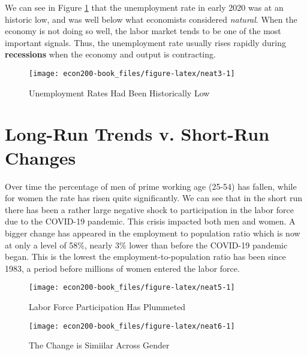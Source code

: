 \documentclass[
]{book}
\begin{document}
We can see in Figure \ref{fig:neat3} that the unemployment rate in early 2020 was at an historic low, and was well below what economists considered \emph{natural}. When the economy is not doing so well, the labor market tends to be one of the most important signals. Thus, the unemployment rate usually rises rapidly during \textbf{recessions} when the economy and output is contracting.

\begin{figure}

{\centering \texttt{[image: econ200-book\_files/figure-latex/neat3-1]} 

}

\caption{Unemployment Rates Had Been Historically Low}\label{fig:neat3}
\end{figure}

\hypertarget{long-run-trends-v.-short-run-changes}{%
\section{Long-Run Trends v. Short-Run Changes}\label{long-run-trends-v.-short-run-changes}}

Over time the percentage of men of prime working age (25-54) has fallen, while for women the rate has risen quite significantly. We can see that in the short run there has been a rather large negative shock to participation in the labor force due to the COVID-19 pandemic. This crisis impacted both men and women. A bigger change has appeared in the employment to population ratio which is now at only a level of 58\%, nearly 3\% lower than before the COVID-19 pandemic began. This is the lowest the employment-to-population ratio has been since 1983, a period before millions of women entered the labor force.

\begin{figure}

{\centering \texttt{[image: econ200-book\_files/figure-latex/neat5-1]} 

}

\caption{Labor Force Participation Has Plummeted}\label{fig:neat5}
\end{figure}

\begin{figure}

{\centering \texttt{[image: econ200-book\_files/figure-latex/neat6-1]} 

}

\caption{The Change is Simiilar Across Gender}\label{fig:neat6}
\end{figure}
\end{document}

